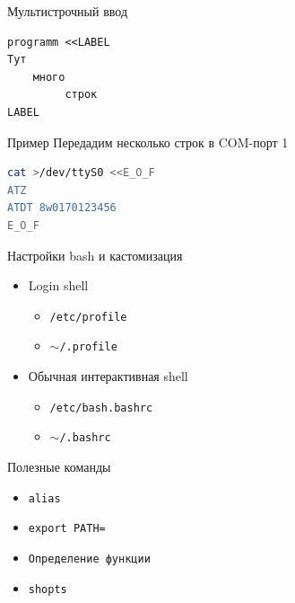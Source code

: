 \documentclass[ignorenonframetext, professionalfonts, hyperref={pdftex, unicode}]{beamer}
\begin{document}
\begin{frame}[fragile]{Мультистрочный ввод}

\begin{verbatim}
programm <<LABEL
Тут
    много
	     строк
LABEL
\end{verbatim}

	\pause
	\begin{block}{Пример}
	Передадим несколько строк в COM-порт 1
\begin{lstlisting}[language=bash]
cat >/dev/ttyS0 <<E_O_F
ATZ
ATDT 8w0170123456
E_O_F
\end{lstlisting}
	\end{block}
\end{frame}




\begin{frame}{Настройки bash и кастомизация}
  \begin{itemize}
    \item Login shell
      \begin{itemize}
        \item {\tt /etc/profile}
        \item {\tt $\sim$/.profile }
      \end{itemize}
    \item Обычная интерактивная shell
      \begin{itemize}
        \item {\tt /etc/bash.bashrc}
        \item {\tt $\sim$/.bashrc}
      \end{itemize}
  \end{itemize}

  Полезные команды
  \begin{itemize}
    \item {\tt alias}
    \item {\tt export PATH=}
    \item {\tt Определение функции}
    \item {\tt shopts}
  \end{itemize}

\end{frame}
\end{document}
